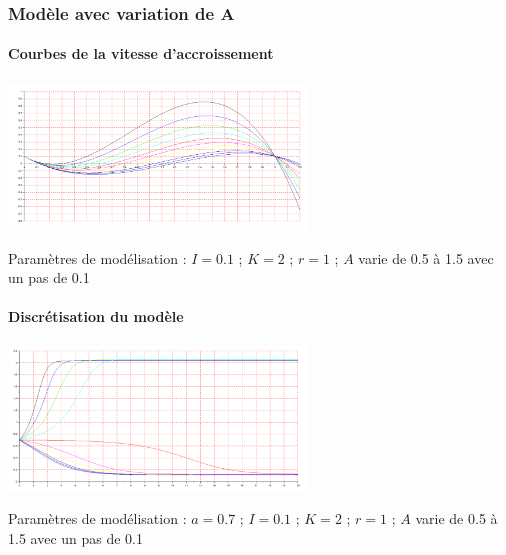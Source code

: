 \documentclass{article}
\begin{document}
\paragraph{}

\subsubsection{Modèle avec variation de A}

\paragraph{Courbes de la vitesse d'accroissement}
\begin{center}
\includegraphics[width=300px]{img/part1/AlleeA.png}
\end{center}
Paramètres de modélisation : $I=0.1$ ; $K=2$ ; $r=1$  ; $A$ varie de 0.5 à 1.5 avec un pas de 0.1
\paragraph{}

\paragraph{Discrétisation du modèle}
\begin{center}
\includegraphics[width=300px]{img/part1/TrajA.png}
\end{center}
Paramètres de modélisation : $a=0.7$ ; $I=0.1$ ; $K=2$ ; $r=1$  ; $A$ varie de 0.5 à 1.5 avec un pas de 0.1
\paragraph{}
\end{document}
